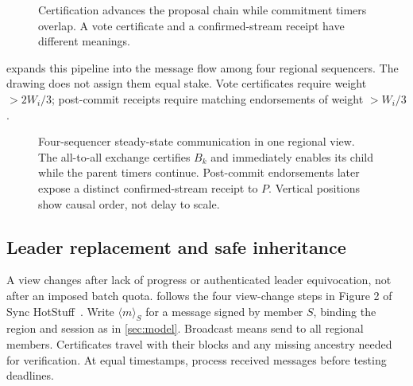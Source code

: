 \documentclass[11pt,a4paper,onecolumn]{article}
\begin{document}
\begin{figure}[H]\centering

\caption{Certification advances the proposal chain while commitment timers
overlap. A vote certificate and a confirmed-stream receipt have different meanings.}
\label{fig:pipeline}
\end{figure}

 expands this pipeline into the message flow
among four regional sequencers. The drawing does not assign them equal stake.
Vote certificates require weight $>2W_i/3$; post-commit receipts require
matching endorsements of weight $>W_i/3$.

\begin{figure}[H]\centering

\caption{Four-sequencer steady-state communication in one regional view.
The all-to-all exchange certifies $B_k$ and immediately enables its child while
the parent timers continue. Post-commit endorsements later expose a distinct
confirmed-stream receipt to $P$. Vertical positions show causal order, not
delay to scale.}
\label{fig:pipeline-communication}
\end{figure}

\subsection{Leader replacement and safe inheritance}
A view changes after lack of progress or authenticated leader equivocation,
not after an imposed batch quota.  follows the four
view-change steps in Figure 2 of Sync HotStuff~\cite{synchotstuff}.
Write $\langle m\rangle_S$ for a message signed by member $S$, binding the
region and session as in \cref{sec:model}. Broadcast means send to
all regional members. Certificates travel with their blocks and any missing
ancestry needed for verification. At equal timestamps, process received
messages before testing deadlines.
\end{document}
